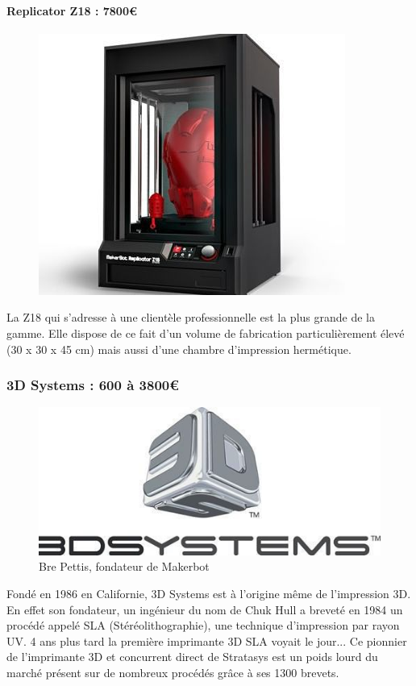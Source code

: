 \documentclass{article}
\begin{document}
\paragraph{Replicator Z18 : 7800\euro{}} \hfill
\begin{figure}[h!]
\centering
\includegraphics[scale=0.4]{./images/replicator-z18.png}
\end{figure}\hfill \break
La Z18 qui s'adresse à une clientèle professionnelle est la plus grande de la gamme. Elle dispose de ce fait d'un volume de fabrication particulièrement élevé (30 x 30 x 45 cm) mais aussi d'une chambre d'impression hermétique.

\subsubsection{3D Systems : 600 à 3800\euro{}}
\begin{figure}[h!]
\centering
\includegraphics[scale=0.4]{./images/3d-systems.png}
\caption{Bre Pettis, fondateur de Makerbot}
\end{figure}\hfill \break
Fondé en 1986 en Californie, 3D Systems est à l'origine même de l'impression 3D. En effet son fondateur, un ingénieur du nom de Chuk Hull a breveté en 1984 un procédé appelé SLA (Stéréolithographie), une technique d'impression par rayon UV. 4 ans plus tard la première imprimante 3D SLA voyait le jour... Ce pionnier de l'imprimante 3D et concurrent direct de Stratasys est un poids lourd du marché présent sur de nombreux procédés grâce à ses 1300 brevets. 
\newpage
\end{document}
